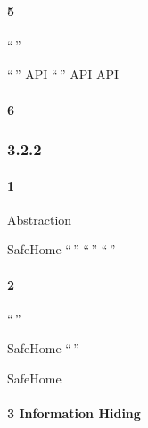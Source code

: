 

\hypertarget{section-18}{%
\paragraph{5}\label{section-18}}


\important{} ``\,''

\important{}``\,'' API ``\,'' API API

\hypertarget{section-19}{%
\paragraph{6}\label{section-19}}





\hypertarget{section-20}{%
\subsubsection{3.2.2}\label{section-20}}

\hypertarget{section-21}{%
\paragraph{1}\label{section-21}}

Abstraction




\important{} SafeHome ``\,'' ``\,'' ``\,''

\hypertarget{section-22}{%
\paragraph{2}\label{section-22}}

``\,''

 SafeHome ``\,''



SafeHome


\hypertarget{information-hiding}{%
\paragraph{3 Information Hiding}\label{information-hiding}}

